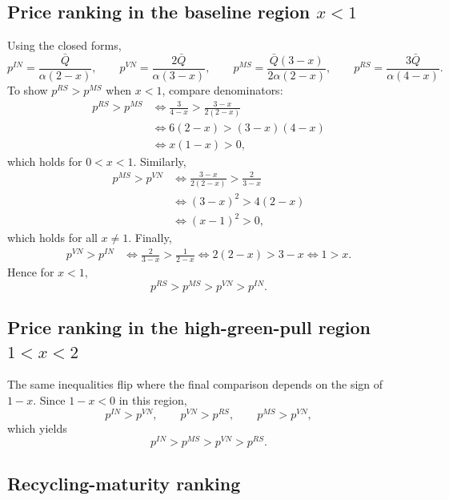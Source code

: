 \subsection{Price ranking in the baseline region $x<1$}

Using the closed forms,
\begin{equation}
 p^{IN}=\frac{\bar Q}{\alpha(2-x)},
 \qquad
 p^{VN}=\frac{2\bar Q}{\alpha(3-x)},
 \qquad
 p^{MS}=\frac{\bar Q(3-x)}{2\alpha(2-x)},
 \qquad
 p^{RS}=\frac{3\bar Q}{\alpha(4-x)}.
\end{equation}
To show $p^{RS}>p^{MS}$ when $x<1$, compare denominators:
\begin{align}
 p^{RS}>p^{MS}
 &\iff \frac{3}{4-x}>\frac{3-x}{2(2-x)} \\
 &\iff 6(2-x)>(3-x)(4-x) \\
 &\iff x(1-x)>0,
\end{align}
which holds for $0<x<1$.
Similarly,
\begin{align}
 p^{MS}>p^{VN}
 &\iff \frac{3-x}{2(2-x)}>\frac{2}{3-x} \\
 &\iff (3-x)^2>4(2-x) \\
 &\iff (x-1)^2>0,
\end{align}
which holds for all $x\neq 1$.
Finally,
\begin{align}
 p^{VN}>p^{IN}
 &\iff \frac{2}{3-x}>\frac{1}{2-x}
 \iff 2(2-x)>3-x
 \iff 1>x.
\end{align}
Hence for $x<1$,
\begin{equation}
 p^{RS}>p^{MS}>p^{VN}>p^{IN}.
\end{equation}

\subsection{Price ranking in the high-green-pull region $1<x<2$}

The same inequalities flip where the final comparison depends on the sign of
$1-x$. Since $1-x<0$ in this region,
\begin{equation}
 p^{IN}>p^{VN},
 \qquad p^{VN}>p^{RS},
 \qquad p^{MS}>p^{VN},
\end{equation}
which yields
\begin{equation}
 p^{IN}>p^{MS}>p^{VN}>p^{RS}.
\end{equation}

\subsection{Recycling-maturity ranking}

